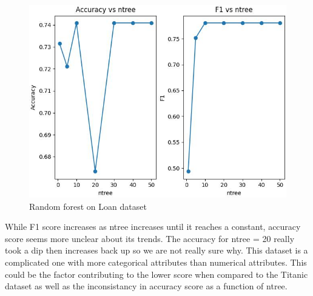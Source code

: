 \documentclass[letterpaper]{article}
\begin{document}
\begin{figure}[H]
	\includegraphics[width=\textwidth]{figures/forest_loan.csv_ig.jpg}
	\caption{Random forest on Loan dataset}
	\label{fig:forest-loan}
\end{figure}

While F1 score increases as ntree increases until it reaches a constant, accuracy score seems more unclear about its trends. The accuracy for
ntree = 20 really took a dip then increases back up so we are not really sure why. This dataset is a complicated one with more categorical attributes
than numerical attributes. This could be the factor contributing to the lower score when compared to the Titanic dataset as well as the inconsistancy
in accuracy score as a function of ntree.
\end{document}
